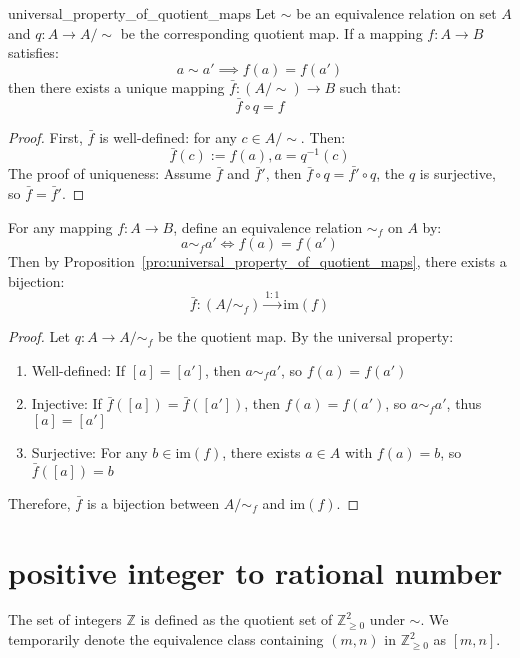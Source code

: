 \documentclass[11pt,lang=en]{elegantbook}
\begin{document}
\begin{proposition}{universal_property_of_quotient_maps}
  Let $\sim$ be an equivalence relation on set $A$ and $q: A \to A/{\sim}$ be the corresponding quotient map. If a mapping $f: A \to B$ satisfies:
  \[
    a \sim a' \implies f(a) = f(a')
  \]
  then there exists a unique mapping $\bar{f}: (A/{\sim}) \to B$ such that:
  \[
    \bar{f} \circ q = f
  \]
\end{proposition}

\begin{proof}
  First, $\bar{f}$ is well-defined: for any $c \in A/{\sim}$. Then:
  \[
    \bar{f}(c) := f(a), a = q^{-1}(c)
  \]
  The proof of uniqueness: Assume $\bar{f}$ and $\bar{f}'$, then $\bar{f}\circ q=\bar{f'} \circ q$, the $q$ is surjective, so $\bar{f}=\bar{f}'$.
\end{proof}

\begin{proposition}
  For any mapping $f : A \to B$, define an equivalence relation $\sim_f$ on $A$ by:
  \[
    a \sim_f a' \iff f(a) = f(a')
  \]
  Then by Proposition~\ref{pro:universal_property_of_quotient_maps}, there exists a bijection:
  \[
    \bar{f} : (A/{\sim_f}) \xrightarrow{1:1} \text{im}(f)
  \]
\end{proposition}

\begin{proof}
  Let $q: A \to A/{\sim_f}$ be the quotient map. By the universal property:
  \begin{enumerate}
    \item Well-defined: If $[a] = [a']$, then $a \sim_f a'$, so $f(a) = f(a')$

    \item Injective: If $\bar{f}([a]) = \bar{f}([a'])$, then $f(a) = f(a')$,
      so $a \sim_f a'$, thus $[a] = [a']$

    \item Surjective: For any $b \in \text{im}(f)$, there exists $a \in A$
      with $f(a) = b$, so $\bar{f}([a]) = b$
  \end{enumerate}
  Therefore, $\bar{f}$ is a bijection between $A/{\sim_f}$ and $\text{im}(f)$.
\end{proof}

\section{positive integer to rational number }

\begin{definition}
  The set of integers $\mathbb{Z}$ is defined as the quotient set of $\mathbb{Z}_{\geq 0}^2$ under $\sim$. We temporarily denote the equivalence class containing $(m,n)$ in $\mathbb{Z}_{\geq 0}^2$ as $[m,n]$.
\end{definition}
\end{document}
